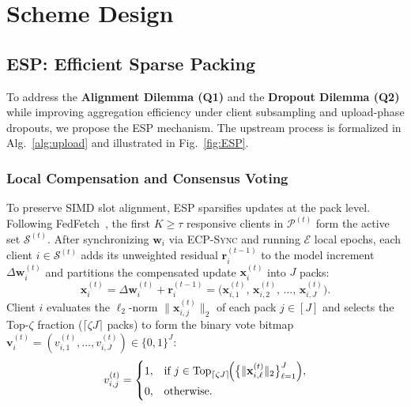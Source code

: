 \section{Scheme Design}
\label{sec:scheme}



\subsection{ESP: Efficient Sparse Packing}
\label{sec:vptopk}

To address the \textbf{Alignment Dilemma (Q1)} and the \textbf{Dropout Dilemma (Q2)} while improving aggregation efficiency under client subsampling and upload-phase dropouts, we propose the ESP mechanism. The upstream process is formalized in Alg.~\ref{alg:upload} and illustrated in Fig.~\ref{fig:ESP}.

\subsubsection{Local Compensation and Consensus Voting}
To preserve SIMD slot alignment, \textsc{ESP} sparsifies updates at the pack level. Following FedFetch~\cite{yan2025fedfetch}, the first $K \ge \tau$ responsive clients in $\mathcal{P}^{(t)}$ form the active set $\mathcal{S}^{(t)}$. After synchronizing $\mathbf{w}_i$ via \textsc{ECP-Sync} and running $\mathcal{E}$ local epochs, each client $i\in\mathcal{S}^{(t)}$ adds its unweighted residual $\mathbf{r}_i^{(t-1)}$ to the model increment $\Delta\mathbf{w}_i^{(t)}$ and partitions the compensated update $\mathbf{x}_i^{(t)}$ into $J$ packs:
\begin{equation}
\mathbf{x}_i^{(t)}
=\Delta\mathbf{w}_i^{(t)}+\mathbf{r}_i^{(t-1)} = \bigl(\mathbf{x}_{i,1}^{(t)},\, \mathbf{x}_{i,2}^{(t)},\, \ldots,\, \mathbf{x}_{i,J}^{(t)}\bigr).
\label{eq:compensated-pack}
\end{equation}
Client $i$ evaluates the $\ell_2$-norm $\|\mathbf{x}_{i,j}^{(t)}\|_2$ of each pack $j \in [J]$ and selects the Top-$\zeta$ fraction ($\lceil \zeta J \rceil$ packs) to form the binary vote bitmap $\mathbf{v}_i^{(t)}=(v_{i,1}^{(t)},\ldots,v_{i,J}^{(t)})\in\{0,1\}^J$:
\begin{equation}
v_{i,j}^{(t)} =
\begin{cases}
1, & \text{if } j \in \operatorname{Top}_{\lceil \zeta J \rceil}\!\Bigl(\bigl\{\|\mathbf{x}_{i,\ell}^{(t)}\|_2\bigr\}_{\ell=1}^{J}\Bigr), \\[4pt]
0, & \text{otherwise}.
\end{cases}
\label{eq:local-vote-bitmap}
\end{equation}

